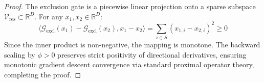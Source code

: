 \begin{proof}
The exclusion gate is a piecewise linear projection onto a sparse subspace $\mathcal{V}_{\text{res}} \subset \mathbb{R}^D$. For any $x_1, x_2 \in \mathbb{R}^D$:
\begin{equation}
\langle \mathcal{G}_{\text{excl}}(x_1) - \mathcal{G}_{\text{excl}}(x_2), x_1 - x_2 \rangle = \sum_{i \in S} (x_{1,i} - x_{2,i})^2 \ge 0
\end{equation}
Since the inner product is non-negative, the mapping is monotone. The backward scaling by $\phi > 0$ preserves strict positivity of directional derivatives, ensuring monotonic gradient descent convergence via standard proximal operator theory, completing the proof.
\end{proof}
